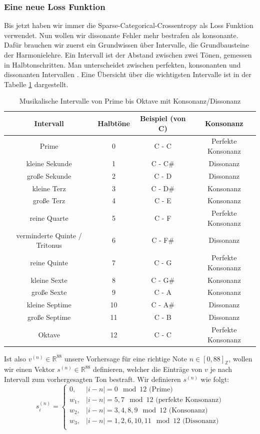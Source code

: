 \subsubsection{Eine neue Loss Funktion}
Bis jetzt haben wir immer die Sparse-Categorical-Crossentropy als Loss Funktion verwendet. Nun wollen wir dissonante Fehler mehr bestrafen als konsonante. Dafür brauchen
wir zuerst ein Grundwissen über Intervalle, die Grundbausteine der Harmonielehre. Ein Intervall ist der Abstand zwischen zwei Tönen, gemessen in Halbtonschritten. Man unterscheidet
zwischen perfekten, konsonanten und dissonanten Intervallen \cite{amon2005lexikon}. Eine Übersicht über die wichtigsten Intervalle ist in der Tabelle \ref{tab:intervale mit konsonanz} dargestellt.
\begin{table}[h]
\centering
\begin{tabular}{|c|c|c|c|}
\hline
\textbf{Intervall} & \textbf{Halbtöne} & \textbf{Beispiel (von C)} & \textbf{Konsonanz} \\
\hline
Prime & 0  & C - C   & Perfekte Konsonanz \\
kleine Sekunde & 1  & C - C\# & Dissonanz \\
große Sekunde & 2  & C - D   & Dissonanz \\
kleine Terz & 3  & C - D\# & Konsonanz \\
große Terz & 4  & C - E   & Konsonanz \\
reine Quarte & 5  & C - F   & Perfekte Konsonanz \\
verminderte Quinte / Tritonus & 6  & C - F\# & Dissonanz \\
reine Quinte & 7  & C - G   & Perfekte Konsonanz \\
kleine Sexte & 8  & C - G\# & Konsonanz \\
große Sexte & 9  & C - A   & Konsonanz \\
kleine Septime & 10 & C - A\# & Dissonanz \\
große Septime & 11 & C - B   & Dissonanz \\
Oktave & 12 & C - C   & Perfekte Konsonanz \\
\hline
\end{tabular}
\caption{Musikalische Intervalle von Prime bis Oktave mit Konsonanz/Dissonanz \cite{amon2005lexikon}}
\label{tab:intervale mit konsonanz}
\end{table}
Ist also $v^{(n)} \in \mathbb{R}^{88}$ unsere Vorhersage für eine richtige Note $n \in [0,88]_{\mathbb{Z}}$, wollen wir einen Vektor $s^{(n)} \in \mathbb{R}^{88}$ definieren, welcher die Einträge von $v$ je nach Intervall zum vorhergesagten Ton bestraft.
Wir definieren $s^{(n)}$ wie folgt:
\[
s^{(n)}_i = 
\begin{cases}
0, & |i - n| = 0 \mod 12 \text{ (Prime)}\\
w_1, & |i - n| = 5,7 \mod 12 \text{ (perfekte Konsonanz)}\\
w_2, & |i - n| = 3,4,8,9 \mod 12 \text{ (Konsonanz)}\\
w_3, & |i - n| = 1,2,6,10,11 \mod 12 \text{ (Dissonanz)}\\
\end{cases}\]

